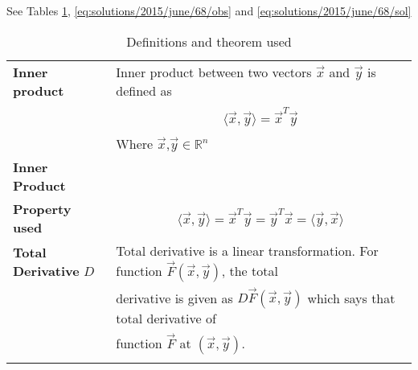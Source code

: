 See Tables \ref{eq:solutions/2015/june/68/deftab}, \ref{eq:solutions/2015/june/68/obs}
and \ref{eq:solutions/2015/june/68/sol}

\onecolumn
\begin{longtable}{|l|l|}
\hline
\endhead
\textbf{Inner product}&Inner product between two vectors $\vec{x}$ and $\vec{y}$ is defined as\\&\parbox{13cm}{\begin{align}
    \langle\vec{x},\vec{y}\rangle=\vec{x}^T\vec{y}\label{eq:solutions/2015/june/68/inp}
\end{align}}\\&Where $\vec{x}$,$\vec{y}\in\mathbb{R}^n$\\
\hline
\textbf{Inner Product}&\\\textbf{Property used}&\parbox{13cm}{\begin{align}
    \langle\vec{x},\vec{y}\rangle=\vec{x}^T\vec{y}=\vec{y}^T\vec{x}=\langle\vec{y},\vec{x}\rangle\label{eq:solutions/2015/june/68/prop1}
    \end{align}}\\
\hline
\textbf{Total Derivative} $D$&Total derivative is a linear transformation. For function $\vec{F}(\vec{x},\vec{y})$, the total\\& derivative is given as $D\vec{F}(\vec{x},\vec{y})$ which says that total derivative of\\&function $\vec{F}$ at $(\vec{x},\vec{y})$.\\
\hline
\caption{Definitions and theorem used}
\label{eq:solutions/2015/june/68/deftab}
\end{longtable}
